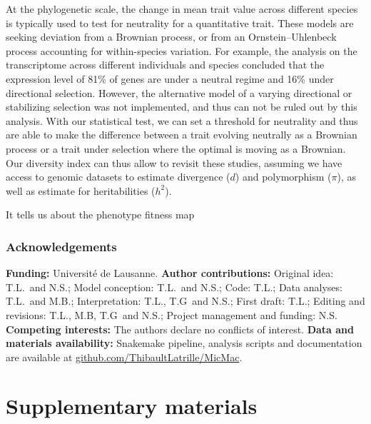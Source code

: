 \documentclass{article}
\newcommand{\Heredity}{h^2}
\begin{document}
At the phylogenetic scale, the change in mean trait value across different species is typically used to test for neutrality for a quantitative trait.
These models are seeking deviation from a Brownian process\cite{catalan_drift_2019}, or from an Ornstein–Uhlenbeck process accounting for within-species variation\cite{rohlfs_phylogenetic_2015}.
For example, the analysis on the transcriptome across different individuals and species concluded that the expression level of 81\% of genes are under a neutral regime and 16\% under directional selection\cite{catalan_drift_2019}.
However, the alternative model of a varying directional or stabilizing selection was not implemented, and thus can not be ruled out by this analysis.
With our statistical test, we can set a threshold for neutrality and thus are able to make the difference between a trait evolving neutrally as a Brownian process or a trait under selection where the optimal is moving as a Brownian.
Our diversity index can thus allow to revisit these studies, assuming we have access to genomic datasets to estimate divergence ($d$) and polymorphism ($\pi$), as well as estimate for heritabilities ($\Heredity$).

It tells us about the phenotype fitness map

\section*{Acknowledgements}
\label{sec:acknowledgment}
\textbf{Funding:}
Université de Lausanne.
\textbf{Author contributions:}
Original idea: T.L.\ and N.S.;
Model conception: T.L.\ and N.S.;
Code: T.L.;
Data analyses: T.L.\ and M.B.;
Interpretation: T.L., T.G\ and N.S.;
First draft: T.L.;
Editing and revisions: T.L., M.B, T.G\ and N.S.;
Project management and funding: N.S\@.
\textbf{Competing interests:}
The authors declare no conflicts of interest.
\textbf{Data and materials availability:}
Snakemake pipeline, analysis scripts and documentation are available at \href{https://github.com/ThibaultLatrille/MicMac}{github.com/ThibaultLatrille/MicMac}.

\printbibliography

\newpage

\part*{Supplementary materials}
\renewcommand{\thetable}{S\arabic{table}}
\renewcommand{\thefigure}{S\arabic{figure}}
\setcounter{figure}{0}
\setcounter{table}{0}
\end{document}

